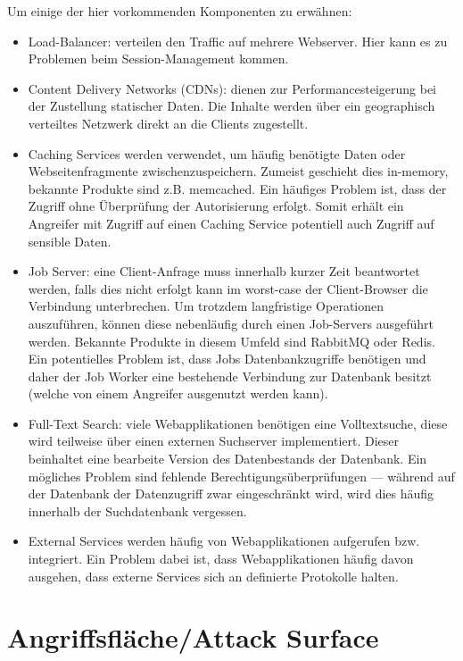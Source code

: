 Um einige der hier vorkommenden Komponenten zu erwähnen:

\begin{itemize}
	\item Load-Balancer: verteilen den Traffic auf mehrere Webserver. Hier kann es zu Problemen beim Session-Management kommen.
	\item Content Delivery Networks (CDNs): dienen zur Performancesteigerung bei der Zustellung statischer Daten. Die Inhalte werden über ein geographisch verteiltes Netzwerk direkt an die Clients zugestellt.
	\item Caching Services werden verwendet, um häufig benötigte Daten oder Webseitenfragmente zwischenzuspeichern. Zumeist geschieht dies in-memory, bekannte Produkte sind z.B. memcached. Ein häufiges Problem ist, dass der Zugriff ohne Überprüfung der Autorisierung erfolgt. Somit erhält ein Angreifer mit Zugriff auf einen Caching Service potentiell auch Zugriff auf sensible Daten.
	\item Job Server: eine Client-Anfrage muss innerhalb kurzer Zeit beantwortet werden, falls dies nicht erfolgt kann im worst-case der Client-Browser die Verbindung unterbrechen. Um trotzdem langfristige Operationen auszuführen, können diese nebenläufig durch einen Job-Servers ausgeführt werden. Bekannte Produkte in diesem Umfeld sind RabbitMQ oder Redis. Ein potentielles Problem ist, dass Jobs Datenbankzugriffe benötigen und daher der Job Worker eine bestehende Verbindung zur Datenbank besitzt (welche von einem Angreifer ausgenutzt werden kann).
	\item Full-Text Search: viele Webapplikationen benötigen eine Volltextsuche, diese wird teilweise über einen externen Suchserver implementiert. Dieser beinhaltet eine bearbeite Version des Datenbestands der Datenbank. Ein mögliches Problem sind fehlende Berechtigungsüberprüfungen --- während auf der Datenbank der Datenzugriff zwar eingeschränkt wird, wird dies häufig innerhalb der Suchdatenbank vergessen.
	\item External Services werden häufig von Webapplikationen aufgerufen bzw. integriert. Ein Problem dabei ist, dass Webapplikationen häufig davon ausgehen, dass externe Services sich an definierte Protokolle halten.
\end{itemize}

\section{Angriffsfläche/Attack Surface}

